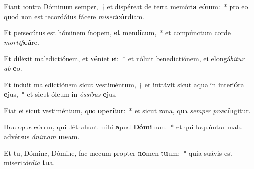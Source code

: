 \item Fiant contra Dóminum semper,~† et dispéreat de terra memóri\textbf{a} e\textbf{ó}rum:~* pro eo quod non est recordátus fácere \textit{mi}\textit{se}\textit{ri}\textbf{cór}diam.
\item Et persecútus est hóminem ínopem, \textbf{et} men\textbf{dí}cum,~* et compúnctum corde \textit{mor}\textit{ti}\textit{fi}\textbf{cá}re.
\item Et diléxit maledictiónem, et \textbf{vé}niet \textbf{e}i:~* et nóluit benedictiónem, et elongá\textit{bi}\textit{tur} \textit{ab} \textbf{e}o.
\item Et índuit maledictiónem sicut vestiméntum,~† et intrávit sicut aqua in interi\textbf{ó}ra \textbf{e}jus,~* et sicut óleum in \textit{ós}\textit{si}\textit{bus} \textbf{e}jus.
\item Fiat ei sicut vestiméntum, quo \textbf{o}pe\textbf{rí}tur:~* et sicut zona, qua \textit{sem}\textit{per} \textit{præ}\textbf{cín}gitur.
\item Hoc opus eórum, qui détrahunt mihi \textbf{a}pud \textbf{Dó}\textbf{mi}num:~* et qui loquúntur mala advérsus \textit{á}\textit{ni}\textit{mam} \textbf{me}am.
\item Et tu, Dómine, Dómine, fac mecum propter \textbf{no}men \textbf{tu}um:~* quia suávis est miseri\textit{cór}\textit{di}\textit{a} \textbf{tu}a.
